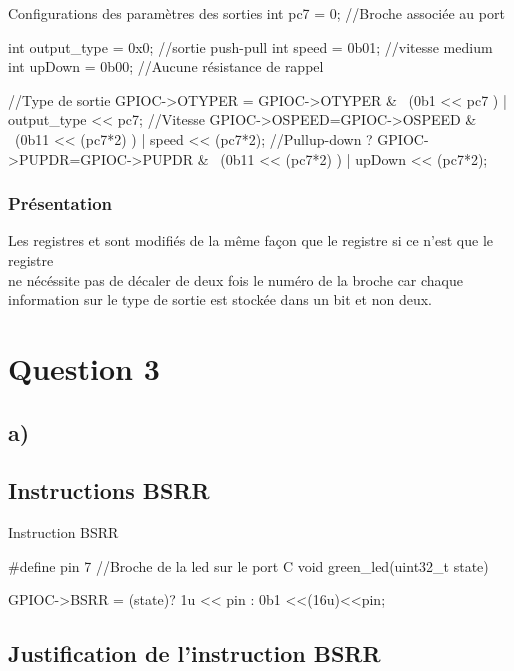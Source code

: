 \documentclass[12pt]{report}
\begin{document}
  \begin{Cpp}{Configurations des paramètres des sorties}
  int pc7 = 0;   //Broche associée au port
  
  int output_type = 0x0;   //sortie push-pull
  int speed = 0b01;        //vitesse medium
  int upDown = 0b00;       //Aucune résistance de rappel

  //Type de sortie
  GPIOC->OTYPER = GPIOC->OTYPER & ~(0b1 << pc7 ) | output_type << pc7; 
  //Vitesse
  GPIOC->OSPEED=GPIOC->OSPEED & ~(0b11 << (pc7*2) ) | speed << (pc7*2);
  //Pullup-down ?
  GPIOC->PUPDR=GPIOC->PUPDR & ~(0b11 << (pc7*2) ) | upDown << (pc7*2);

\end{Cpp}

\subsubsection{Présentation}

Les registres  et  sont modifiés de la même façon que le registre   si ce n'est que le registre \\
 ne nécéssite pas de décaler de deux fois le numéro de la broche car chaque information sur le type de sortie est stockée dans un bit et non deux.


\section{Question 3}

\subsection{a)}

\subsection{Instructions BSRR}

\begin{Cpp}{Instruction BSRR}
  
  #define pin 7 //Broche de la led sur le port C
  void green_led(uint32_t state) {

    GPIOC->BSRR = (state)?  1u << pin  :  0b1 <<(16u)<<pin;
    
  }
  

\end{Cpp}

\subsection{Justification de l'instruction BSRR}
\end{document}
